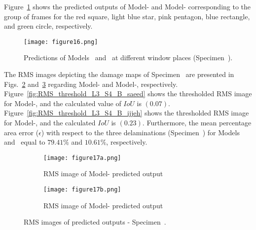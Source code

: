 Figure~\ref{fig:L3_S4_B_5HC_predictions} shows the predicted outputs of Model- and Model- corresponding to the group of frames for the red square, light blue star, pink pentagon, blue rectangle, and green circle, respectively.
\begin{figure}[!h]
	\centering
	\texttt{[image: figure16.png]}
	\caption{Predictions of Models~ and~ at different window places (Specimen~).}
	\label{fig:L3_S4_B_5HC_predictions}
\end{figure}

The RMS images depicting the damage maps of Specimen~ are presented in Figs.~\ref{fig:RMS_L3_S4_B_saeed} and~\ref{fig:RMS_L3_S4_B_ijjeh} regarding Model- and Model-, respectively.
Figure~\ref{fig:RMS_threshold_L3_S4_B_saeed} shows the thresholded RMS image for Model-, and the calculated value of \(IoU\) is \((0.07)\).
Figure~\ref{fig:RMS_threshold_L3_S4_B_ijjeh} shows the thresholded RMS image for Model-, and the calculated \(IoU\) is \((0.23)\).
Furthermore, the mean percentage area error (\(\epsilon\)) with respect to the three delaminations (Specimen~) for Models~ and~ equal to \(79.41\%\) and \(10.61\%\), respectively.
\begin{figure} [!h]
	\begin{subfigure}[b]{.49\textwidth}
		\centering
		\texttt{[image: figure17a.png]}
		\caption{RMS image of Model- predicted output}
		\label{fig:RMS_L3_S4_B_saeed}
	\end{subfigure}
	\hfill
	\begin{subfigure}[b]{.49\textwidth}
		\centering
		\texttt{[image: figure17b.png]}
		\caption{RMS image of Model- predicted output} 
		\label{fig:RMS_L3_S4_B_ijjeh}
	\end{subfigure}
	\caption{RMS images of predicted outputs - Specimen~.}
	\label{fig:RMS_L3_S4_B__images}
\end{figure} 
